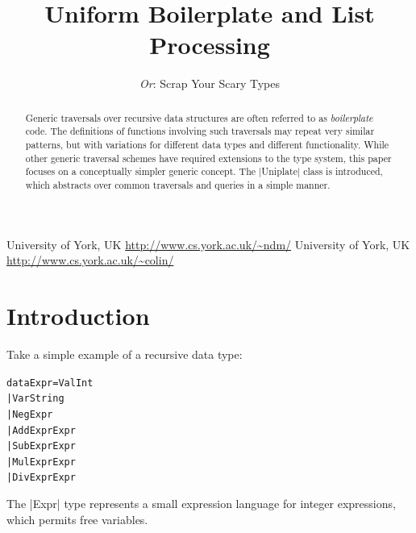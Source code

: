 \documentclass[preprint]{sigplanconf}
\newenvironment{code}{\begin{alltt}\small}{\end{alltt}}
\begin{document}
\copyrightdata{[to be supplied]}

\titlebanner{\today{} - \currenttime{}}        %
\preprintfooter{}   %

\title{Uniform Boilerplate and List Processing}
\subtitle{\textit{Or}: Scrap Your Scary Types}

           {University of York, UK}
           {\url{http://www.cs.york.ac.uk/~ndm/}}
           {University of York, UK}
           {\url{http://www.cs.york.ac.uk/~colin/}}

\maketitle

\begin{abstract}
Generic traversals over recursive data structures are often referred to as \textit{boilerplate} code. The definitions of functions involving such traversals may repeat very similar patterns, but with variations for different data types and different functionality. While other generic traversal schemes have required extensions to the type system, this paper focuses on a conceptually simpler generic concept. The |Uniplate| class is introduced, which abstracts over common traversals and queries in a simple manner.
\end{abstract}

\section{Introduction}

Take a simple example of a recursive data type:

\begin{code}
data Expr  =  Val  Int
           |  Var  String
           |  Neg  Expr
           |  Add  Expr  Expr
           |  Sub  Expr  Expr
           |  Mul  Expr  Expr
           |  Div  Expr  Expr
\end{code}

The |Expr| type represents a small expression language for integer expressions, which permits free variables.
\end{document}
